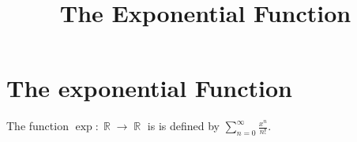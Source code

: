 \documentclass[a4paper, 11pt]{article}
\title{The Exponential Function}
\DeclareMathOperator{\R}{\mathbb{R}}
\begin{document}
\tableofcontents
\section{The exponential Function}
\begin{definition} 
The function $\exp: \R \rightarrow \R$ is  is defined by $\sum_{n=0}^{\infty}\frac{x^{n}}{{n}!}$.
\end{definition}
\end{document}
